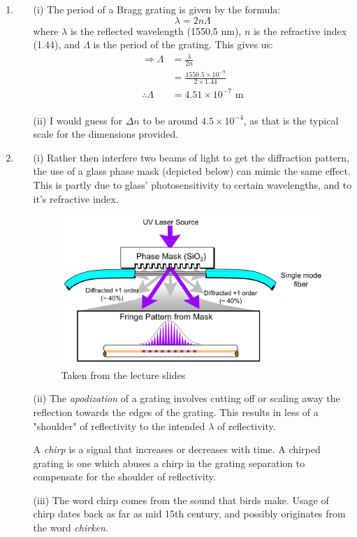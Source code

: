 \documentclass[10pt,a4paper]{article}
\begin{document}
\begin{enumerate}
	\item 
		\begin{itemize}
			\item[(i)] The period of a Bragg grating is given by the formula:
				\begin{equation*}
					\lambda = 2 n \Lambda
				\end{equation*}
				where $\lambda$ is the reflected wavelength (1550.5 nm), $n$ is the refractive index (1.44), and $\Lambda$ is the period of the grating. This gives us:
				\begin{align*}
					\Rightarrow \Lambda &= \frac{\lambda}{2n} \\
					 &= \frac{1550.5 \times 10^{-9}}{2 \times 1.44} \\
					\therefore \Lambda &= 4.51 \times 10^{-7} \mbox{ m} \\
				\end{align*}
			\item[(ii)] I would guess for $\Delta n$ to be around $4.5 \times 10 ^{-4}$, as that is the typical scale for the dimensions provided.
		\end{itemize}
	\item
		\begin{itemize}
			\item[(i)] Rather then interfere two beams of light to get the diffraction pattern, the use of a glass phase mask (depicted below) can mimic the same effect. This is partly due to glass' photosensitivity to certain wavelengths, and to it's refractive index.
				\begin{figure}[!h]
					\begin{center}
						\includegraphics[width=0.7\linewidth]{phaseMask.png}
					\end{center}
					\caption{Taken from the lecture slides}
				\end{figure}
			\item[(ii)] The \textit{apodization} of a grating involves cutting off or scaling away the reflection towards the edges of the grating. This results in less of a "shoulder" of reflectivity to the intended $\lambda$ of reflectivity.

			A \textit{chirp} is a signal that increases or decreases with time. A chirped grating is one which abuses a chirp in the grating separation to compensate for the shoulder of reflectivity.
			\item[(iii)] The word chirp comes from the sound that birds make. Usage of chirp dates back as far as mid 15th century, and possibly originates from the word \textit{chirken}.
		\end{itemize}
\end{enumerate}
\end{document}
